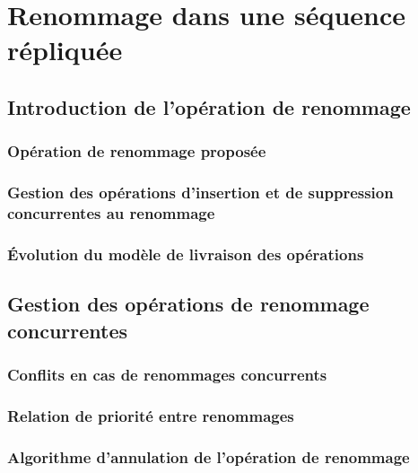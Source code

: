 \NumberThisInToc
\chapter{Renommage dans une séquence répliquée}
\minitoc
\label{chap:renamablelogootsplit}



\section{Introduction de l'opération de renommage}
\label{sec:centralised-rls}

\subsection{Opération de renommage proposée}


\subsection{Gestion des opérations d'insertion et de suppression concurrentes au renommage}


\subsection{Évolution du modèle de livraison des opérations}


\section{Gestion des opérations de renommage concurrentes}
\label{sec:distributed-rls}

\subsection{Conflits en cas de renommages concurrents}


\subsection{Relation de priorité entre renommages}


\subsection{Algorithme d'annulation de l'opération de renommage}


